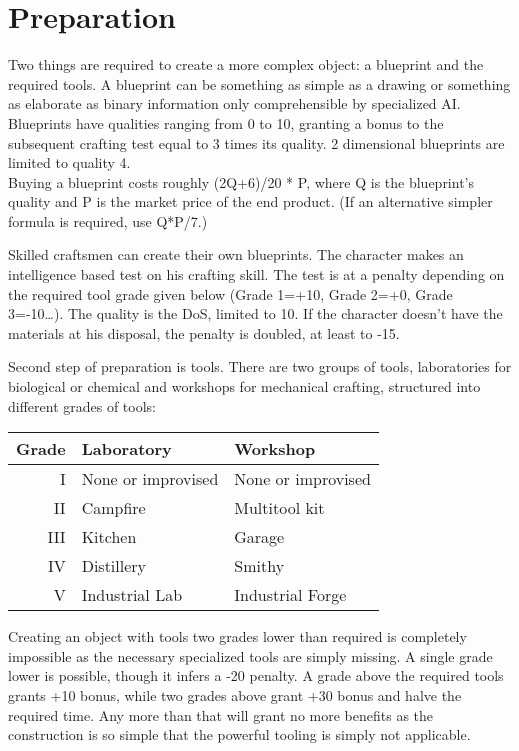 \documentclass[12pt,a4paper,openany]{book}
\begin{document}
	\chapter{Preparation}
	Two things are required to create a more complex object: a blueprint and the required tools.
	A blueprint can be something as simple as a drawing or something as elaborate as binary information only comprehensible by specialized AI. Blueprints have qualities ranging from 0 to 10, granting a bonus to the subsequent crafting test equal to 3 times its quality. 2 dimensional blueprints are limited to quality 4.\\
	Buying a blueprint costs roughly (2Q+6)/20 * P, where Q is the blueprint’s quality and P is the market price of the end product. (If an alternative simpler formula is required, use Q*P/7.)\par
	Skilled craftsmen can create their own blueprints. The character makes an intelligence based test on his crafting skill. The test is at a penalty depending on the required tool grade given below (Grade 1=+10, Grade 2=+0, Grade 3=-10…). The quality is the DoS, limited to 10. If the character doesn’t have the materials at his disposal, the penalty is doubled, at least to -15.\par
	\newpage %
	Second step of preparation is tools. There are two groups of tools, laboratories for biological or chemical and workshops for mechanical crafting, structured into different grades of tools:
	\par
	\begin{tabularx}{\columnwidth}{r|XX}
		Grade & Laboratory & Workshop \\
		\hline
		I & None or improvised & None or improvised \\
		II & Campfire & Multitool kit \\
		III & Kitchen & Garage \\
		IV & Distillery & Smithy \\
		V & Industrial Lab & Industrial Forge
	\end{tabularx}
	\par
	Creating an object with tools two grades lower than required is completely impossible as the necessary specialized tools are simply missing. A single grade lower is possible, though it infers a -20 penalty. A grade above the required tools grants +10 bonus, while two grades above grant +30 bonus and halve the required time. Any more than that will grant no more benefits as the construction is so simple that the powerful tooling is simply not applicable.\\
\end{document}
